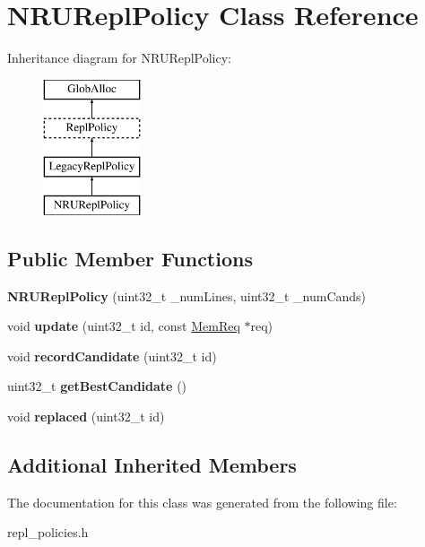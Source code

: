 \hypertarget{classNRUReplPolicy}{\section{N\-R\-U\-Repl\-Policy Class Reference}
\label{classNRUReplPolicy}
}
Inheritance diagram for N\-R\-U\-Repl\-Policy\-:\begin{figure}[H]
\begin{center}
\leavevmode
\includegraphics[height=4.000000cm]{classNRUReplPolicy}
\end{center}
\end{figure}
\subsection*{Public Member Functions}
\begin{DoxyCompactItemize}
\item 
\hypertarget{classNRUReplPolicy_a27c7f78c587c0b735e64bb3cd54f1e49}{{\bfseries N\-R\-U\-Repl\-Policy} (uint32\-\_\-t \-\_\-num\-Lines, uint32\-\_\-t \-\_\-num\-Cands)}\label{classNRUReplPolicy_a27c7f78c587c0b735e64bb3cd54f1e49}

\item 
\hypertarget{classNRUReplPolicy_a7a4233813a7fe1d7ceb97ac252b89a6e}{void {\bfseries update} (uint32\-\_\-t id, const \hyperlink{structMemReq}{Mem\-Req} $\ast$req)}\label{classNRUReplPolicy_a7a4233813a7fe1d7ceb97ac252b89a6e}

\item 
\hypertarget{classNRUReplPolicy_ad7f8db759d58d04a9a00734bb2e328fd}{void {\bfseries record\-Candidate} (uint32\-\_\-t id)}\label{classNRUReplPolicy_ad7f8db759d58d04a9a00734bb2e328fd}

\item 
\hypertarget{classNRUReplPolicy_a663ecc98a9c6eeb907517ed522f72829}{uint32\-\_\-t {\bfseries get\-Best\-Candidate} ()}\label{classNRUReplPolicy_a663ecc98a9c6eeb907517ed522f72829}

\item 
\hypertarget{classNRUReplPolicy_a43a44c191266d3c26459c971a68ce715}{void {\bfseries replaced} (uint32\-\_\-t id)}\label{classNRUReplPolicy_a43a44c191266d3c26459c971a68ce715}

\end{DoxyCompactItemize}
\subsection*{Additional Inherited Members}


The documentation for this class was generated from the following file\-:\begin{DoxyCompactItemize}
\item 
repl\-\_\-policies.\-h\end{DoxyCompactItemize}
